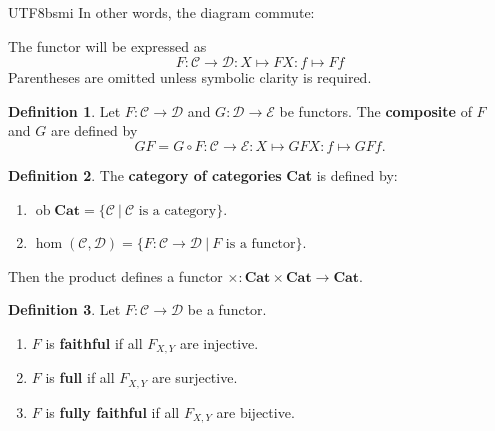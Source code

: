 \documentclass[12pt]{article}
\theoremstyle{definition}
\newtheorem{definition}{Definition}[section]
\newcommand\<{\langle}
\renewcommand\>{\rangle}
\DeclareMathOperator{\ob}{ob}
\begin{document}
\begin{CJK}{UTF8}{bsmi}
In other words, the diagram commute:
\begin{center}
\end{center}

The functor will be expressed as
\[
    F:\mathcal{C}\to\mathcal{D}:X\mapsto FX:f\mapsto Ff
\]
Parentheses are omitted unless symbolic clarity is required.

\begin{definition}
    Let $F:\mathcal{C}\to\mathcal{D}$ and $G:\mathcal{D}\to\mathcal{E}$ be functors.
    The \textbf{composite} of $F$ and $G$ are defined by
    \[
        GF = G\circ F:\mathcal{C}\to\mathcal{E}:X\mapsto GFX:f\mapsto GFf.
    \]
\end{definition}

\begin{definition}
    The \textbf{category of categories} \textbf{Cat} is defined by:
    \begin{enumerate}
        \item $\ob\textbf{Cat} = \{\mathcal{C}\ |\ \mathcal{C}\text{ is a category}\}$.
        \item $\hom(\mathcal{C}, \mathcal{D})=\{F:\mathcal{C}\to\mathcal{D}\ |\ F\text{ is a functor}\}$.
    \end{enumerate}
\end{definition}

Then the product defines a functor $\times:\textbf{Cat}\times\textbf{Cat}\to\textbf{Cat}$.

\begin{definition}
    Let $F:\mathcal{C}\to\mathcal{D}$ be a functor.
    \begin{enumerate}
        \item $F$ is \textbf{faithful} if all $F_{X, Y}$ are injective.
        \item $F$ is \textbf{full} if all $F_{X, Y}$ are surjective.
        \item $F$ is \textbf{fully faithful} if all $F_{X, Y}$ are bijective.
    \end{enumerate}
\end{definition}


\end{CJK}
\end{document}
